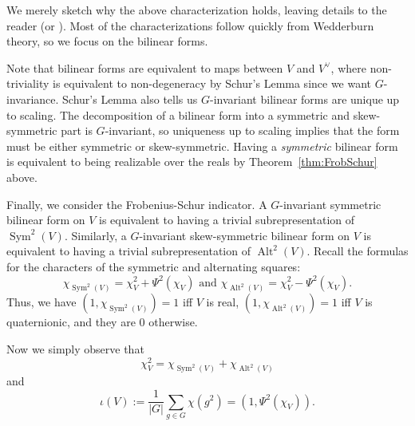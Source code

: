 \documentclass[12pt]{article}
\theoremstyle{plain}
\theoremstyle{definition}
\theoremstyle{remark}
\numberwithin{equation}{section}
\begin{document}
We merely sketch why the above characterization holds,
leaving details to the reader (or \cite[\S{13.2}]{Serre}).
Most of the characterizations follow quickly from Wedderburn theory,
so we focus on the bilinear forms.

Note that bilinear forms are equivalent to maps between $V$ and
$V^\vee$, where non-triviality is equivalent to non-degeneracy by
Schur's Lemma since we want $G$-invariance.
Schur's Lemma also tells us $G$-invariant bilinear forms
are unique up to scaling.
The decomposition of a bilinear form into a symmetric and skew-symmetric
part is $G$-invariant, so uniqueness up to scaling implies that the form
must be either symmetric or skew-symmetric.
Having a \emph{symmetric} bilinear form is equivalent to being realizable over
the reals by Theorem~\ref{thm:FrobSchur} above.

Finally, we consider the Frobenius-Schur indicator.
A $G$-invariant symmetric bilinear form on $V$ is equivalent to
having a trivial subrepresentation of $\operatorname{Sym}^2(V)$.
Similarly, a $G$-invariant skew-symmetric bilinear form on $V$
is equivalent to having a trivial subrepresentation of
$\operatorname{Alt}^2(V)$.
Recall the formulas for the characters of the
symmetric and alternating squares:
\[
\chi_{\operatorname{Sym}^2(V)} = \chi_V^2 + \Psi^2(\chi_V)
\textrm{ and }
\chi_{\operatorname{Alt}^2(V)} = \chi_V^2 - \Psi^2(\chi_V).
\]
Thus, we have $(1,\chi_{\operatorname{Sym}^2(V)})=1$ iff $V$ is real,
$(1,\chi_{\operatorname{Alt}^2(V)})=1$ iff $V$ is quaternionic,
and they are $0$ otherwise.

Now we simply observe that
\[
\chi_V^2 = \chi_{\operatorname{Sym}^2(V)} + \chi_{\operatorname{Alt}^2(V)}
\]
and
\[
\iota(V) := \frac{1}{|G|}\sum_{g \in G} \chi(g^2)
=(1, \Psi^2(\chi_V)).
\]



\end{document}

